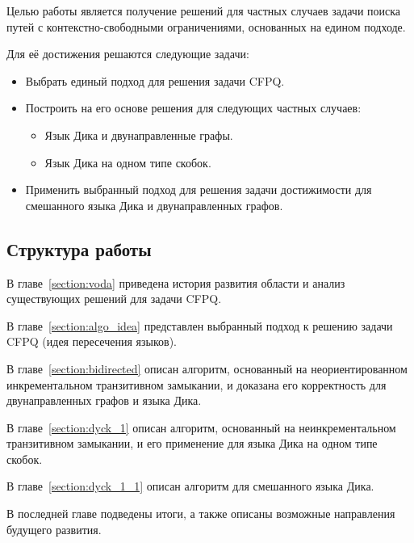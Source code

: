 Целью работы является получение решений для частных случаев задачи поиска путей с контекстно-свободными ограничениями, основанных на едином подходе.

Для её достижения решаются следующие задачи:

  \begin{itemize}
    \item Выбрать единый подход для решения задачи CFPQ.
    \item Построить на его основе решения для следующих частных случаев:
      \begin{itemize}
        \item Язык Дика и двунаправленные графы.
        \item Язык Дика на одном типе скобок.
      \end{itemize}
    \item Применить выбранный подход для решения задачи достижимости для смешанного языка Дика и двунаправленных графов.
  \end{itemize}

\subsection*{Структура работы}

В главе~\ref{section:voda} приведена история развития области и анализ существующих решений для задачи CFPQ.

В главе~\ref{section:algo_idea} представлен выбранный подход к решению задачи CFPQ (идея пересечения языков).

В главе~\ref{section:bidirected} описан алгоритм, основанный на неориентированном инкрементальном транзитивном замыкании, и доказана его корректность для двунаправленных графов и языка Дика.

В главе~\ref{section:dyck_1} описан алгоритм, основанный на неинкрементальном транзитивном замыкании, и его применение для языка Дика на одном типе скобок.

В главе~\ref{section:dyck_1_1} описан алгоритм для смешанного языка Дика.

В последней главе подведены итоги, а также описаны возможные направления будущего развития.
